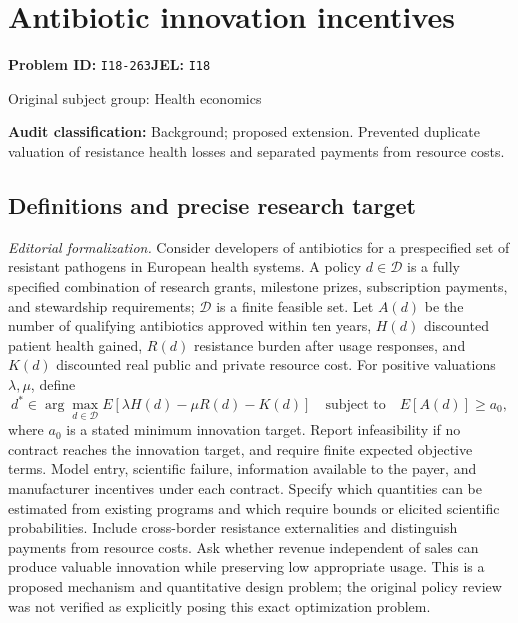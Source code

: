 \documentclass[11pt,a4paper]{article}
\begin{document}
\section*{Antibiotic innovation incentives}
\textbf{Problem ID:} \texttt{I18-263}\quad \textbf{JEL:} \texttt{I18}\par
\label{problem:OP-0446}
{\sffamily\small\color{muted}Original subject group: Health economics\par}
\label{definitions:problem:30007728}
\textbf{Audit classification:} Background; proposed extension. Prevented duplicate valuation of resistance health losses and separated payments from resource costs.
\subsection*{Definitions and precise research target}
\textit{Editorial formalization.} Consider developers of antibiotics for a prespecified set of resistant pathogens in European health systems. A policy \(d\in\mathcal D\) is a fully specified combination of research grants, milestone prizes, subscription payments, and stewardship requirements; \(\mathcal D\) is a finite feasible set. Let \(A(d)\) be the number of qualifying antibiotics approved within ten years, \(H(d)\) discounted patient health gained, \(R(d)\) resistance burden after usage responses, and \(K(d)\) discounted real public and private resource cost. For positive valuations \(\lambda,\mu\), define
\[d^*\in\arg\max_{d\in\mathcal D}E[\lambda H(d)-\mu R(d)-K(d)]\quad\text{subject to}\quad E[A(d)]\geq a_0,\]
where \(a_0\) is a stated minimum innovation target. Report infeasibility if no contract reaches the innovation target, and require finite expected objective terms. Model entry, scientific failure, information available to the payer, and manufacturer incentives under each contract. Specify which quantities can be estimated from existing programs and which require bounds or elicited scientific probabilities. Include cross-border resistance externalities and distinguish payments from resource costs. Ask whether revenue independent of sales can produce valuable innovation while preserving low appropriate usage. This is a proposed mechanism and quantitative design problem; the original policy review was not verified as explicitly posing this exact optimization problem.
\end{document}
